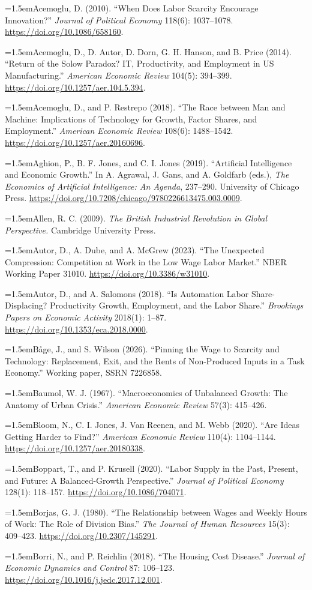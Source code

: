 \documentclass[12pt]{article}
\theoremstyle{plain}
\newcommand{\refentry}[1]{\par\hangindent=1.5em\hangafter=1\noindent #1}
\begin{document}
{\small\singlespacing
\refentry{Acemoglu, D. (2010). ``When Does Labor Scarcity Encourage Innovation?'' \emph{Journal of Political Economy} 118(6): 1037--1078. \url{https://doi.org/10.1086/658160}.}
\refentry{Acemoglu, D., D. Autor, D. Dorn, G. H. Hanson, and B. Price (2014). ``Return of the Solow Paradox? IT, Productivity, and Employment in US Manufacturing.'' \emph{American Economic Review} 104(5): 394--399. \url{https://doi.org/10.1257/aer.104.5.394}.}
\refentry{Acemoglu, D., and P. Restrepo (2018). ``The Race between Man and Machine: Implications of Technology for Growth, Factor Shares, and Employment.'' \emph{American Economic Review} 108(6): 1488--1542. \url{https://doi.org/10.1257/aer.20160696}.}
\refentry{Aghion, P., B. F. Jones, and C. I. Jones (2019). ``Artificial Intelligence and Economic Growth.'' In A. Agrawal, J. Gans, and A. Goldfarb (eds.), \emph{The Economics of Artificial Intelligence: An Agenda}, 237--290. University of Chicago Press. \url{https://doi.org/10.7208/chicago/9780226613475.003.0009}.}
\refentry{Allen, R. C. (2009). \emph{The British Industrial Revolution in Global Perspective.} Cambridge University Press.}
\refentry{Autor, D., A. Dube, and A. McGrew (2023). ``The Unexpected Compression: Competition at Work in the Low Wage Labor Market.'' NBER Working Paper 31010. \url{https://doi.org/10.3386/w31010}.}
\refentry{Autor, D., and A. Salomons (2018). ``Is Automation Labor Share-Displacing? Productivity Growth, Employment, and the Labor Share.'' \emph{Brookings Papers on Economic Activity} 2018(1): 1--87. \url{https://doi.org/10.1353/eca.2018.0000}.}
\refentry{B\r{a}ge, J., and S. Wilson (2026). ``Pinning the Wage to Scarcity and Technology: Replacement, Exit, and the Rents of Non-Produced Inputs in a Task Economy.'' Working paper, SSRN 7226858.}
\refentry{Baumol, W. J. (1967). ``Macroeconomics of Unbalanced Growth: The Anatomy of Urban Crisis.'' \emph{American Economic Review} 57(3): 415--426.}
\refentry{Bloom, N., C. I. Jones, J. Van Reenen, and M. Webb (2020). ``Are Ideas Getting Harder to Find?'' \emph{American Economic Review} 110(4): 1104--1144. \url{https://doi.org/10.1257/aer.20180338}.}
\refentry{Boppart, T., and P. Krusell (2020). ``Labor Supply in the Past, Present, and Future: A Balanced-Growth Perspective.'' \emph{Journal of Political Economy} 128(1): 118--157. \url{https://doi.org/10.1086/704071}.}
\refentry{Borjas, G. J. (1980). ``The Relationship between Wages and Weekly Hours of Work: The Role of Division Bias.'' \emph{The Journal of Human Resources} 15(3): 409--423. \url{https://doi.org/10.2307/145291}.}
\refentry{Borri, N., and P. Reichlin (2018). ``The Housing Cost Disease.'' \emph{Journal of Economic Dynamics and Control} 87: 106--123. \url{https://doi.org/10.1016/j.jedc.2017.12.001}.}
}
\end{document}
